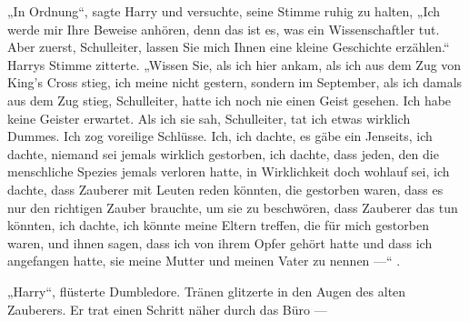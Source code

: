 „In Ordnung“, sagte Harry und versuchte, seine Stimme ruhig zu halten,
„Ich werde mir Ihre Beweise anhören, denn das ist es, was ein Wissenschaftler tut. Aber zuerst, Schulleiter, lassen Sie mich Ihnen eine kleine Geschichte erzählen.“ Harrys Stimme zitterte.
„Wissen Sie, als ich hier ankam, als ich aus dem Zug von King’s Cross stieg, ich meine nicht gestern, sondern im September, als ich damals aus dem Zug stieg, Schulleiter, hatte ich noch nie einen Geist gesehen. Ich habe keine Geister erwartet. Als ich sie sah, Schulleiter, tat ich etwas wirklich Dummes. Ich zog voreilige Schlüsse. Ich, ich dachte, es gäbe ein Jenseits, ich dachte, niemand sei jemals wirklich gestorben, ich dachte, dass jeden, den die menschliche Spezies jemals verloren hatte, in Wirklichkeit doch wohlauf sei, ich dachte, dass Zauberer mit Leuten reden könnten, die gestorben waren, dass es nur den richtigen Zauber brauchte, um sie zu beschwören, dass Zauberer das tun könnten, ich dachte, ich könnte meine Eltern treffen, die für mich gestorben waren, und ihnen sagen, dass ich von ihrem Opfer gehört hatte und dass ich angefangen hatte, sie meine Mutter und meinen Vater zu nennen —“ .

„Harry“, flüsterte Dumbledore. Tränen glitzerte in den Augen des alten Zauberers. Er trat einen Schritt näher durch das Büro —

